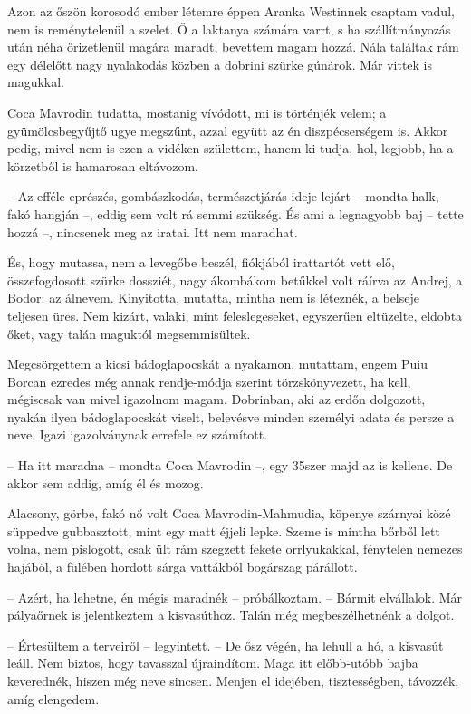 \documentclass{IEEEtran}
\begin{document}
Azon az őszön korosodó ember létemre éppen Aranka Westinnek csaptam vadul, nem
is reménytelenül a szelet. Ő a laktanya számára varrt, s ha szállítmányozás
után néha őrizetlenül magára maradt, bevettem magam hozzá. Nála találtak rám
egy délelőtt nagy nyalakodás közben a dobrini szürke gúnárok. Már vittek is
magukkal.

Coca Mavrodin tudatta, mostanig vívódott, mi is történjék velem; a
gyümölcsbegyűjtő ugye megszűnt, azzal együtt az én diszpécserségem is. Akkor
pedig, mivel nem is ezen a vidéken születtem, hanem ki tudja, hol, legjobb, ha
a körzetből is hamarosan eltávozom.

– Az efféle eprészés, gombászkodás, természetjárás ideje lejárt – mondta halk,
fakó hangján –, eddig sem volt rá semmi szükség. És ami a legnagyobb baj –
tette hozzá –, nincsenek meg az iratai. Itt nem maradhat.

És, hogy mutassa, nem a levegőbe beszél, fiókjából irattartót vett elő,
összefogdosott szürke dossziét, nagy ákombákom betűkkel volt ráírva az Andrej,
a Bodor: az álnevem. Kinyitotta, mutatta, mintha nem is léteznék, a belseje
teljesen üres. Nem kizárt, valaki, mint feleslegeseket, egyszerűen eltüzelte,
eldobta őket, vagy talán maguktól megsemmisültek.

Megcsörgettem a kicsi bádoglapocskát a nyakamon, mutattam, engem Puiu Borcan
ezredes még annak rendje-módja szerint törzskönyvezett, ha kell, mégiscsak van
mivel igazolnom magam. Dobrinban, aki az erdőn dolgozott, nyakán ilyen
bádoglapocskát viselt, belevésve minden személyi adata és persze a neve. Igazi
igazolványnak errefele ez számított.

– Ha itt maradna – mondta Coca Mavrodin –, egy 35szer majd az is kellene. De
akkor sem addig, amíg él és mozog.

Alacsony, görbe, fakó nő volt Coca Mavrodin-Mahmudia, köpenye szárnyai közé
süppedve gubbasztott, mint egy matt éjjeli lepke. Szeme is mintha bőrből lett
volna, nem pislogott, csak ült rám szegzett fekete orrlyukakkal, fénytelen
nemezes hajából, a fülében hordott sárga vattákból bogárszag párállott.

– Azért, ha lehetne, én mégis maradnék – próbálkoztam. – Bármit elvállalok.
Már pályaőrnek is jelentkeztem a kisvasúthoz. Talán még megbeszélhetnénk a
dolgot.

– Értesültem a terveiről – legyintett. – De ősz végén, ha lehull a hó, a
kisvasút leáll. Nem biztos, hogy tavasszal újraindítom. Maga itt előbb-utóbb
bajba keverednék, hiszen még neve sincsen. Menjen el idejében, tisztességben,
távozzék, amíg elengedem.
\end{document}
